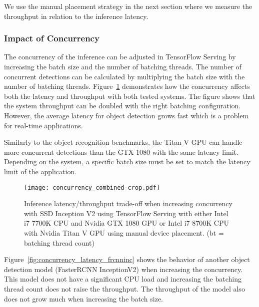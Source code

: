 \documentclass[sigconf]{acmart}
\begin{document}
We use the manual placement strategy in the next section where we measure the throughput in relation to the inference latency.

\subsubsection{Impact of Concurrency}

The concurrency of the inference can be adjusted in TensorFlow Serving by increasing the batch size and the number of batching threads. The number of concurrent detections can be calculated by multiplying the batch size with the number of batching threads. Figure~\ref{fig:concurrency_combined} demonstrates how the concurrency affects both the latency and throughput with both tested systems. The figure shows that the system throughput can be doubled with the right batching configuration. However, the average latency for object detection grows fast which is a problem for real-time applications.

Similarly to the object recognition benchmarks, the Titan V GPU can handle more concurrent detections than the GTX 1080 with the same latency limit. Depending on the system, a specific batch size must be set to match the latency limit of the application.

\begin{figure}[t]
\centering
\texttt{[image: concurrency\_combined-crop.pdf]}
\caption{Inference latency/throughput trade-off when increasing concurrency with SSD Inception V2 using TensorFlow Serving with either Intel i7 7700K CPU and Nvidia GTX 1080 GPU or Intel i7 8700K CPU with Nvidia Titan V GPU using manual device placement. (bt = batching thread count)}
\label{fig:concurrency_combined}
\end{figure}

Figure~\ref{fig:concurrency_latency_frcnninc} shows the behavior of another object detection model (FasterRCNN InceptionV2) when increasing the concurrency. This model does not have a significant CPU load and increasing the batching thread count does not raise the throughput. The throughput of the model also does not grow much when increasing the batch size.
\end{document}

